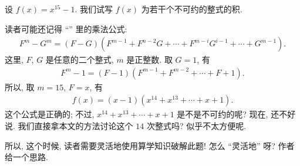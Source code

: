 \begin{example}
    设 $f(x) = x^{15}-1$. 我们试写 $f(x)$ 为若干个不可约的整式的积.

    读者可能还记得 ``\SyntheticDivision'' 里的乘法公式:
    \begin{align*}
        F^m - G^m = (F - G)(F^{m-1} + F^{n-2} G + \cdots + F^{m-i} G^{i-1} + \cdots + G^{m-1}).
    \end{align*}
    这里, $F$, $G$ 是任意的二个整式, $m$ 是正整数. 取 $G = 1$, 有
    \begin{align*}
        F^m - 1 = (F - 1)(F^{m-1} + F^{m-2} + \cdots + F + 1). \tag*{(D)}
    \end{align*}
    所以, 取 $m = 15$, $F = x$, 有
    \begin{align*}
        f(x) = (x - 1)(x^{14} + x^{13} + \cdots + x + 1).
    \end{align*}
    这个公式是正确的; 不过, $x^{14} + x^{13} + \cdots + x + 1$ 是不是不可约的呢? 现在, 还不好说. 我们直接拿本文的方法讨论这个 $14$ 次整式吗? 似乎不太方便呢.

    所以, 这个时候, 读者需要灵活地使用算学知识破解此题! 怎么 ``灵活地'' 呀? 作者给一个思路.


\end{example}
